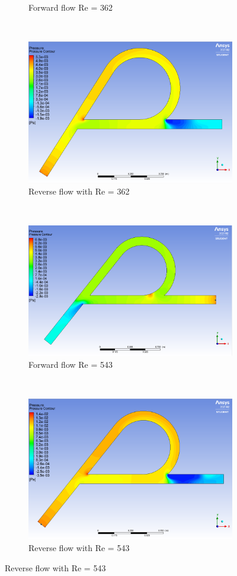 \begin{figure}[H]
\begin{subfigure}{.45\textwidth}
  \caption{Forward flow Re = 362}
  \label{fig:x_d_norm}
\end{subfigure}%
~
\begin{subfigure}{.45\textwidth}
  \centering
  \includegraphics[width=.9\linewidth]{images/task2/L600/reverse362.png}
  \caption{Reverse flow with Re = 362}
  \label{fig:x_d_norm_actual}
\end{subfigure}
~
\begin{subfigure}{.45\textwidth}
  \centering
  \includegraphics[width=.9\linewidth]{images/task2/L600/forward543.png}
  \caption{Forward flow Re = 543}
  \label{fig:x_d_norm}
\end{subfigure}%
~
\begin{subfigure}{.45\textwidth}
  \centering
  \includegraphics[width=.9\linewidth]{images/task2/L600/reverse543.png}
  \caption{Reverse flow with Re = 543}
  \label{fig:x_d_norm_actual}
\end{subfigure}


\end{figure}
